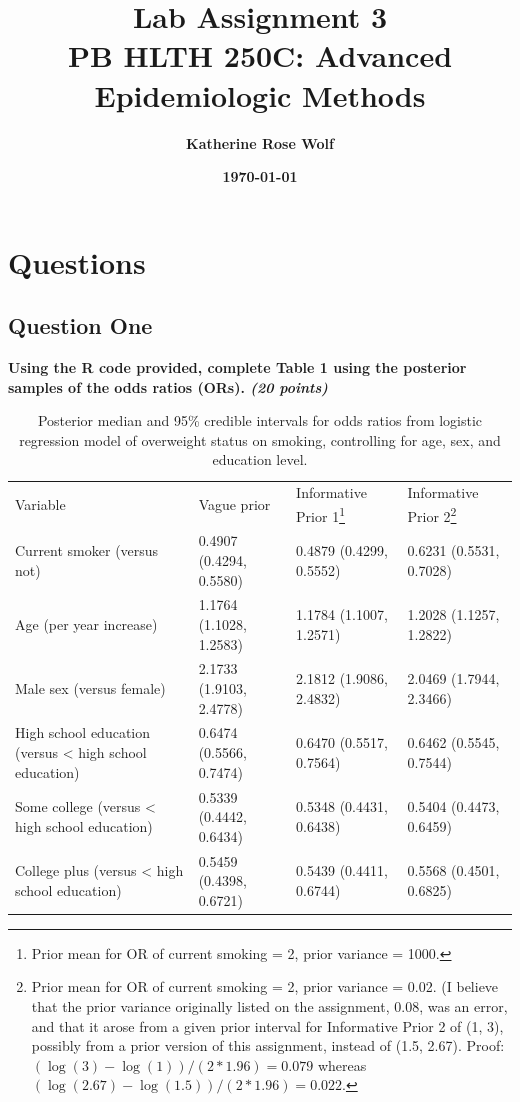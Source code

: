 \documentclass[
  11pt,
]{article}
\title{\fontsize{15pt}{5pt}\selectfont\textbf{Lab Assignment 3}\\
\vspace{.2cm}\textbf{PB HLTH 250C: Advanced Epidemiologic Methods}}
\author{\vspace{-.1cm}\fontsize{15pt}{0pt}\selectfont\textbf{Katherine Rose Wolf}}
\date{\vspace{-.3cm}\fontsize{15pt}{0pt}\selectfont\textbf{\today}}
\begin{document}
\maketitle

\pagebreak

\hypertarget{questions}{%
\section{Questions}\label{questions}}

\hypertarget{question-one}{%
\subsection{Question One}\label{question-one}}

\textbf{Using the R code provided, complete Table 1 using the posterior samples of the odds ratios (ORs). \textit{(20 points)}}

\begin{landscape}
\begin{table}
\begin{minipage}{\textwidth}
\caption{Posterior median and 95\% credible intervals for odds ratios from logistic regression model of overweight status on smoking, controlling for age, sex, and education level.}
\begin{tabular}{llll}
\hline
  Variable & Vague prior & Informative Prior 1\footnote{Prior mean for OR of current smoking = 2, prior variance = 1000.} & Informative Prior 2\footnote{Prior mean for OR of current smoking = 2, prior variance = 0.02. (I believe that the prior variance originally listed on the assignment, 0.08, was an error, and that it arose from a given prior interval for Informative Prior 2 of (1, 3), possibly from a prior version of this assignment, instead of (1.5, 2.67). Proof: $(\log(3)-\log(1))/(2*1.96) = 0.079$ whereas $(\log(2.67)-\log(1.5))/(2*1.96) = 0.022$.} \\
  \cline{1-4}
Current smoker (versus not)  & 0.4907 (0.4294, 0.5580) & 0.4879 (0.4299, 0.5552) & 0.6231 (0.5531, 0.7028) \\
Age (per year increase)      & 1.1764 (1.1028, 1.2583) & 1.1784 (1.1007, 1.2571) & 1.2028 (1.1257, 1.2822) \\
Male sex (versus female) & 2.1733 (1.9103, 2.4778) & 2.1812 (1.9086, 2.4832) & 2.0469 (1.7944, 2.3466) \\
High school education (versus < high school education) & 0.6474 (0.5566, 0.7474) & 0.6470 (0.5517, 0.7564) & 0.6462 (0.5545, 0.7544) \\
Some college (versus < high school education) & 0.5339 (0.4442, 0.6434) & 0.5348 (0.4431, 0.6438) & 0.5404 (0.4473, 0.6459) \\
College plus (versus < high school education) & 0.5459 (0.4398, 0.6721) & 0.5439 (0.4411, 0.6744) & 0.5568 (0.4501, 0.6825) \\
\hline
\end{tabular}
\end{minipage}
\end{table}
\end{landscape}
\end{document}

